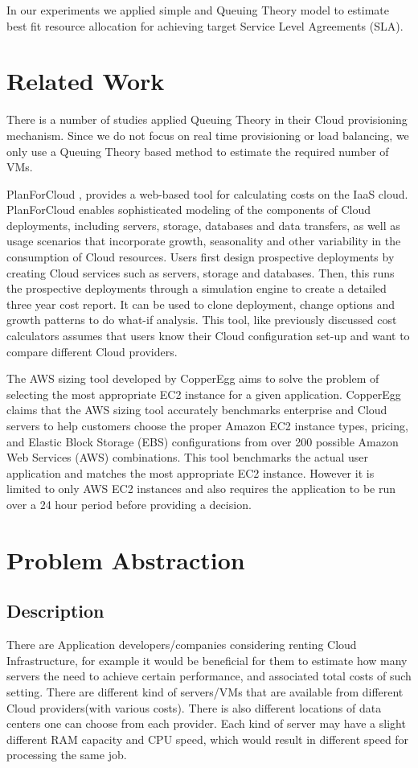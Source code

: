 In our experiments we  applied simple and Queuing Theory \cite{queueing_theory} model to estimate best fit resource allocation for achieving target Service Level Agreements (SLA).

\section{Related Work}

There is a number of studies \cite{lee:10,RodrigoICPP,xuzichuan} applied Queuing Theory in their Cloud provisioning mechanism. Since we do not focus on real time provisioning or load balancing, we only use a Queuing Theory based method to estimate the required number of VMs. 

PlanForCloud \cite{PlanForCloud}, provides a web-based tool for calculating costs on the IaaS cloud. PlanForCloud enables sophisticated modeling of the components of Cloud deployments, including servers, storage, databases and data transfers, as well as usage scenarios that incorporate growth, seasonality and other variability in the consumption of Cloud resources. Users first design prospective deployments by creating Cloud services such as servers, storage and databases. Then, this runs the prospective deployments through a simulation engine to create a detailed three year cost report. It can be used to clone deployment, change options and growth patterns to do what-if analysis. This tool, like previously discussed cost calculators assumes that users know their Cloud configuration set-up
and want to compare different Cloud providers.

The AWS sizing tool developed by CopperEgg \cite{AWS_Sizing_Tool} aims to solve the problem of selecting the most appropriate EC2 instance for a given application. CopperEgg claims that the AWS sizing tool accurately benchmarks enterprise and Cloud servers to help customers choose the proper Amazon EC2 instance types, pricing, and Elastic Block Storage (EBS) configurations from over 200 possible Amazon Web Services (AWS) combinations. This tool benchmarks the actual user application and matches the most appropriate EC2 instance. However it is limited to only AWS EC2 instances and also requires the application to be run over a 24 hour period before providing a decision.

\section{Problem Abstraction}
\subsection{Description}
There are Application developers/companies considering renting Cloud Infrastructure, for example it would be beneficial for them to estimate how many servers the need to achieve certain performance, and associated total costs of such setting.
There are different kind of servers/VMs that are available from different Cloud providers(with various costs).
There is also different locations of data centers one can choose from each provider. Each kind of server may have a slight different RAM capacity and CPU speed, which would result in different speed for processing the same job.

